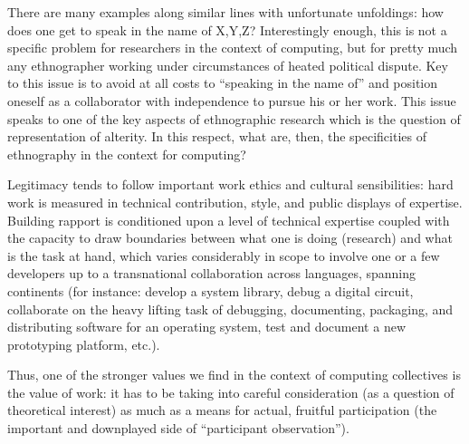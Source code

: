 \documentclass[10pt,letter,oneside]{scrartcl}
\begin{document}

There are many examples along similar lines with unfortunate
unfoldings: how does one get to speak in the name of X,Y,Z?
Interestingly enough, this is not a specific problem for researchers
in the context of computing, but for pretty much any ethnographer
working under circumstances of heated political dispute. Key to this
issue is to avoid at all costs to ``speaking in the name of'' and
position oneself as a collaborator with independence to pursue his or
her work. This issue speaks to one of the key aspects of ethnographic
research which is the question of representation of alterity. In this
respect, what are, then, the specificities of ethnography in the
context for computing?





Legitimacy tends to follow important work ethics and cultural
sensibilities: hard work is measured in technical contribution, style,
and public displays of expertise. Building rapport is conditioned upon
a level of technical expertise coupled with the capacity to draw
boundaries between what one is doing (research) and what is the task
at hand, which varies considerably in scope to involve one or a few
developers up to a transnational collaboration across languages,
spanning continents (for instance: develop a system library, debug a
digital circuit, collaborate on the heavy lifting task of debugging,
documenting, packaging, and distributing software for an operating
system, test and document a new prototyping platform, etc.).


Thus, one of the stronger values we find in the context of computing
collectives is the value of work: it has to be taking into careful
consideration (as a question of theoretical interest) as much as a
means for actual, fruitful participation (the important and downplayed
side of ``participant
observation'').  %
\end{document}
